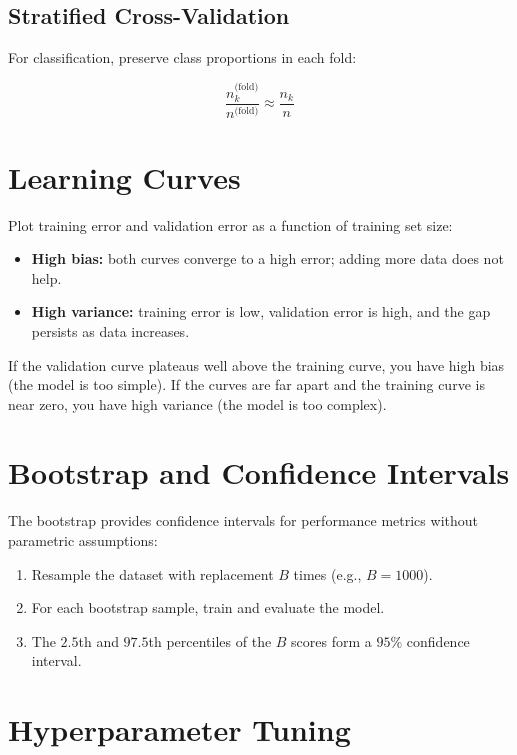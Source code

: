 \subsection{Stratified Cross-Validation}

For classification, preserve class proportions in each fold:

\[
	\frac{n_k^{\text{(fold)}}}{n^{\text{(fold)}}} \approx \frac{n_k}{n}
\]

\section{Learning Curves}

Plot training error and validation error as a function of training set size:

\begin{itemize}
	\item \textbf{High bias:} both curves converge to a high error; adding more data does not help.
	\item \textbf{High variance:} training error is low, validation error is high, and the gap persists as data increases.
\end{itemize}

\begin{principle}
	If the validation curve plateaus well above the training curve, you have high bias (the model is too simple). If the curves are far apart and the training curve is near zero, you have high variance (the model is too complex).
\end{principle}

\section{Bootstrap and Confidence Intervals}

The bootstrap provides confidence intervals for performance metrics without parametric assumptions:

\begin{enumerate}
	\item Resample the dataset with replacement $B$ times (e.g., $B = 1000$).
	\item For each bootstrap sample, train and evaluate the model.
	\item The $2.5$th and $97.5$th percentiles of the $B$ scores form a $95\%$ confidence interval.
\end{enumerate}

\section{Hyperparameter Tuning}

